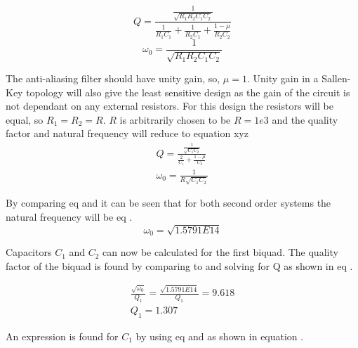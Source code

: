 \begin{equation}\label{eq:7_1_4_SecondOrderSystemQ}
    Q = \frac{ \frac{1}{\sqrt{R_1R_2C_1C_2}} }{ \frac{1}{R_1C_1} + \frac{1}{R_2C_1} + \frac{1-\mu}{R_2C_2}}
 \end{equation}
 \begin{equation}\label{eq:7_1_4_SecondOrderSystemNatural}
    \omega_0 = \frac{1}{\sqrt{R_1 R_2 C_1 C_2}}
 \end{equation}

 The anti-aliasing filter should have unity gain, so, $\mu = 1$. Unity gain in a Sallen-Key topology will also give the least sensitive design as the gain of the circuit is not dependant on any external resistors. For this design the resistors will be equal, so $R_1 = R_2 = R$. $R$ is arbitrarily chosen to be $R = 1e3$ and the quality factor and natural frequency will reduce to equation xyz
 \begin{equation}\label{eq:7_1_4_SecondOrderSystemQ}
    \begin{aligned}
        Q = \frac{ \frac{1}{\sqrt{C_1C_2}} }{ \frac{2}{C_1} + \frac{1-\mu}{C_2}}\\
        \omega_0 = \frac{1}{R\sqrt{C_1 C_2}}
    \end{aligned}
 \end{equation}

By comparing eq  and  it can be seen that for both second order systems the natural frequency will be eq .
\begin{equation}\label{eq:7_1_4_SecondOrderSystemNaturalFrq}
    \omega_0 = \sqrt{1.5791E14}
 \end{equation}

 Capacitors $C_1$ and $C_2$ can now be calculated for the first biquad. The quality factor of the biquad is found by comparing  to  and solving for Q as shown in eq .

 \begin{equation}\label{eq:7_1_4_Q1}
    \begin{aligned}
        \frac{\sqrt{\omega_0}}{Q_1} = \frac{\sqrt{1.5791E14}}{Q_1}= 9.618\\
        Q_1 = 1.307
    \end{aligned}
 \end{equation}

 An expression is found for $C_1$ by using eq  and  as shown in equation .

